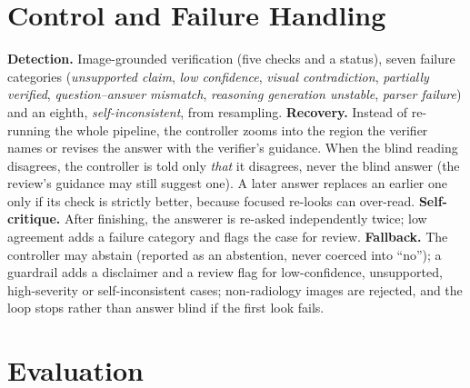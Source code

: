\documentclass{article}
\begin{document}
\section{Control and Failure Handling}
\textbf{Detection.} Image-grounded verification (five checks and a status), seven failure categories
(\emph{unsupported claim}, \emph{low confidence}, \emph{visual contradiction}, \emph{partially verified},
\emph{question--answer mismatch}, \emph{reasoning generation unstable}, \emph{parser failure}) and an eighth,
\emph{self-inconsistent}, from resampling.
\textbf{Recovery.} Instead of re-running the whole pipeline, the controller zooms into the region the verifier
names or revises the answer with the verifier's guidance. When the blind reading disagrees, the controller is told
only \emph{that} it disagrees, never the blind answer (the review's guidance may still suggest one). A later answer replaces an earlier one only if its check
is strictly better, because focused re-looks can over-read.
\textbf{Self-critique.} After finishing, the answerer is re-asked independently twice; low agreement adds a failure
category and flags the case for review.
\textbf{Fallback.} The controller may abstain (reported as an abstention, never coerced into ``no''); a guardrail
adds a disclaimer and a review flag for low-confidence, unsupported, high-severity or self-inconsistent cases;
non-radiology images are rejected, and the loop stops rather than answer blind if the first look fails.

\section{Evaluation}\label{sec:eval}
\end{document}

